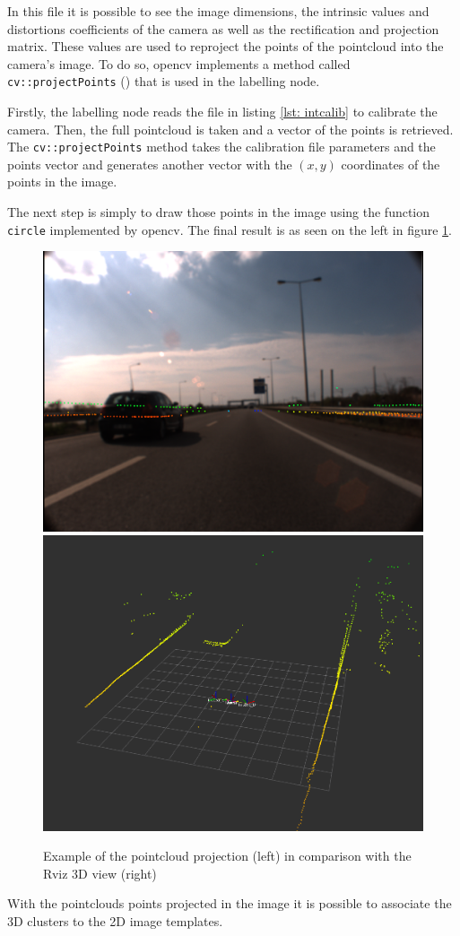 In this file it is possible to see the image dimensions, the intrinsic values and distortions coefficients of the camera as well as the rectification and projection matrix. These values are used to reproject the points of the pointcloud into the camera's image. To do so, \gls{opencv} implements a method called \texttt{cv::projectPoints} (\cite{OpenCVa}) that is used in the labelling node. 

Firstly, the labelling node reads the file in listing \ref{lst: intcalib} to calibrate the camera. Then, the full pointcloud is taken and a vector of the points is retrieved. The \texttt{cv::projectPoints} method takes the calibration file parameters and the points vector and generates another vector with the $(x,y)$ coordinates of the points in the image.

The next step is simply to draw those points in the image using the function \texttt{circle} implemented by \gls{opencv}. The final result is as seen on the left in figure \ref{fig:projectpoints}.

\begin{figure}[htp]
	
	\centering
	\includegraphics[width=.47\textwidth]{caplabel/imgs/projectpc.png}
	\includegraphics[width=.45\textwidth]{caplabel/imgs/rvizpc.png}
	
	\caption{Example of the pointcloud projection (left) in comparison with the Rviz 3D view (right)}
	\label{fig:projectpoints}
	
\end{figure}

With the pointclouds points projected in the image it is possible to associate the 3D clusters to the 2D image templates.


